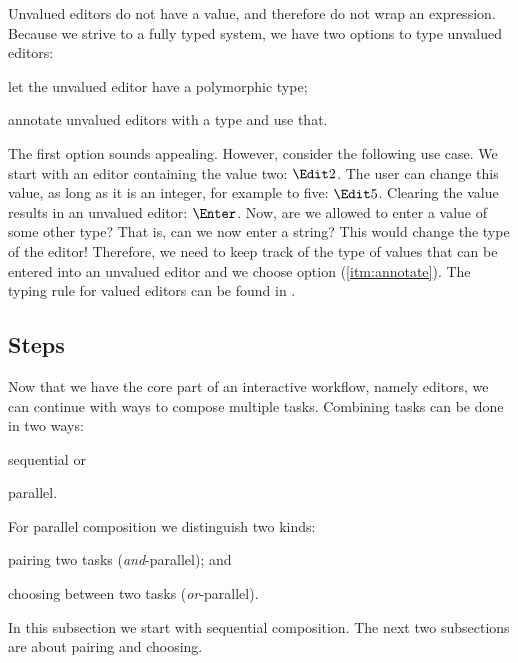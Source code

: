 Unvalued editors do not have a value,
and therefore do not wrap an expression.
Because we strive to a fully typed system,
we have two options to type unvalued editors:
\begin{enumerate*}
  \item let the unvalued editor have a polymorphic type;
  \item annotate unvalued editors with a type and use that. \label{itm:annotate}
\end{enumerate*}

The first option sounds appealing.
However, consider the following use case.
We start with an editor containing the value two: $\Edit 2$.
The user can change this value, as long as it is an integer,
for example to five: $\Edit 5$.
Clearing the value results in an unvalued editor: $\Enter$.
Now, are we allowed to enter a value of some other type?
That is, can we now enter a string?
This would change the type of the editor!
Therefore,
we need to keep track of the type of values that can be entered into an unvalued editor
and we choose option (\ref{itm:annotate}).
The typing rule for valued editors can be found in .




\subsection{Steps}

Now that we have the core part of an interactive workflow,
namely editors,
we can continue with ways to compose multiple tasks.
Combining tasks can be done in two ways:
\begin{enumerate*}
  \item sequential or
  \item parallel.
\end{enumerate*}
For parallel composition we distinguish two kinds:
\begin{enumerate*}[(a)]
  \item pairing two tasks (\emph{and}-parallel); and
  \item choosing between two tasks (\emph{or}-parallel).
\end{enumerate*}
In this subsection we start with sequential composition.
The next two subsections are about pairing and choosing.

